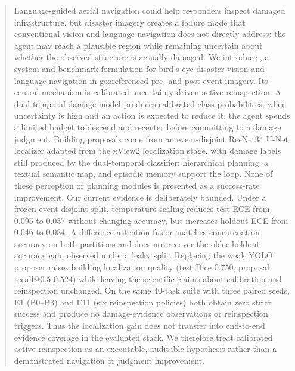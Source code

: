 \begin{abstract}
Language-guided aerial navigation could help responders inspect damaged infrastructure, but disaster imagery creates a failure mode that conventional vision-and-language navigation does not directly address: the agent may reach a plausible region while remaining uncertain about whether the observed structure is actually damaged.
We introduce \ProjectName, a system and benchmark formulation for bird's-eye disaster vision-and-language navigation in georeferenced pre- and post-event imagery.
Its central mechanism is calibrated uncertainty-driven active reinspection.
A dual-temporal damage model produces calibrated class probabilities; when uncertainty is high and an action is expected to reduce it, the agent spends a limited budget to descend and recenter before committing to a damage judgment.
Building proposals come from an event-disjoint ResNet34 U-Net localizer adapted from the xView2 localization stage, with damage labels still produced by the dual-temporal classifier; hierarchical planning, a textual semantic map, and episodic memory support the loop.
None of these perception or planning modules is presented as a success-rate improvement.
Our current evidence is deliberately bounded.
Under a frozen event-disjoint split, temperature scaling reduces test ECE from 0.095 to 0.037 without changing accuracy, but increases holdout ECE from 0.046 to 0.084.
A difference-attention fusion matches concatenation accuracy on both partitions and does not recover the older holdout accuracy gain observed under a leaky split.
Replacing the weak YOLO proposer raises building localization quality (test Dice $0.750$, proposal recall@$0.5$ $0.524$) while leaving the scientific claims about calibration and reinspection unchanged.
On the same 40-task suite with three paired seeds, E1 (B0--B3) and E11
(six reinspection policies) both obtain zero strict success and produce no
damage-evidence observations or reinspection triggers.
Thus the localization gain does not transfer into end-to-end evidence
coverage in the evaluated stack.
We therefore treat calibrated active reinspection as an executable, auditable hypothesis rather than a demonstrated navigation or judgment improvement.
\end{abstract}
